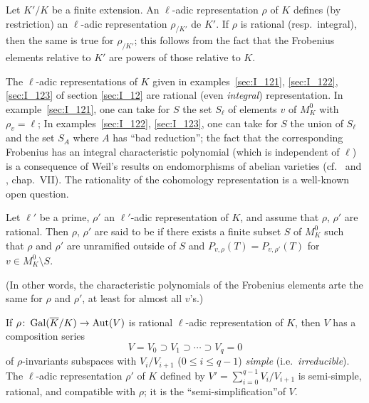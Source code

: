 \begin{obs}\label{rmk:I_23_1}
	Let $K'/K$ be a finite extension. An $\ell$-adic representation $\rho$
	of $K$ defines (by restriction) an $\ell$-adic representation
	$\rho_{/K'}$ de $K'$. If $\rho$ is rational (resp.\ integral), then the
	same is true for $\rho_{/K'}$; this follows from the fact that the
	Frobenius elements relative to $K'$ are powers of those relative to
	$K$.
\end{obs}

\begin{ex}
The $\ell$-adic representations of $K$ given in examples~\ref{sec:I_121},
\ref{sec:I_122}, \ref{sec:I_123} of section \ref{sec:I_12} are rational (even
\emph{integral}) representation.
In example~\ref{sec:I_121}, one can take for $S$ the set $S_{\ell}$ of
elements $v$ of $M_K^0$ with $\rho_v = \ell$; In examples~\ref{sec:I_122},
\ref{sec:I_123}, one can take for $S$ the union of $S_\ell$ and the set
$S_A$ where $A$ has ``bad reduction''; the fact that the corresponding
Frobenius has an integral characteristic polynomial (which is independent of
$\ell$) is a consequence of Weil's results on endomorphisms of abelian
varieties (cf.\ \cite{40} and \cite{12}, chap.~VII).
\dpage
The rationality of the cohomology representation is a well-known open question.
\end{ex}

\begin{mydef}
Let $\ell'$ be a prime, $\rho'$ an $\ell'$-adic representation of $K$, and assume that $\rho$, $\rho'$ are rational. Then $\rho$, $\rho'$ are said to be  if there exists a finite subset $S$ of $M_K^0$ such that $\rho$ and $\rho'$ are unramified outside of $S$ and $P_{v,\rho}(T) = P_{v,\rho'}(T)$ for $v \in M_K^0 \setminus S$.
\end{mydef}
(In other words, the characteristic polynomials of the Frobenius elements arte
the same for $\rho$ and $\rho'$, at least for almost all $v$'s.)

If $\rho\colon \operatorname{Gal}(\overline{K}/K) \to \operatorname{Aut}(V)$ is rational $\ell$-adic
representation of $K$, then $V$ has a composition series
\[
	V = V_0 \supset V_1 \supset \cdots \supset V_q = 0
\]
of $\rho$-invariants subspaces with $V_i / V_{i+1}$ ($0 \leq i \leq q - 1$)
\emph{simple} (i.e.\ \emph{irreducible}). The $\ell$-adic representation
$\rho'$ of $K$ defined by $V' = \sum_{i=0}^{q-1} V_i / V_{i + 1}$ is
semi-simple, rational, and compatible with $\rho$; it is the
``semi-simplification''\break of $V$. 

